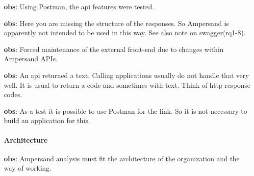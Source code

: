 \begin{obs}\label{obs:rq1-72:14-11}
    \textbf{obs}: Using Postman, the api features were tested.
\end{obs}
    
\begin{obs}\label{obs:rq1-73:14-11}
    \textbf{obs}: Here you are missing the structure of the responses.
    So Ampersand is apparently not intended to be used in this way.
    See also note on swagger(rq1-8).
\end{obs}
    
\begin{obs}\label{obs:rq1-74:16-11}
    \textbf{obs}: Forced maintenance of the external front-end due to changes within Ampersand APIs.
\end{obs}

\begin{obs}\label{obs:rq4-2}
    \textbf{obs}: An api returned a text.
    Calling applications usually do not handle that very well.
    It is usual to return a code and sometimes with text.
    Think of http response codes.
\end{obs}

\begin{obs}\label{obs:rq4-5}
    \textbf{obs}: As a test it is possible to use Postman for the link.
    So it is not necessary to build an application for this.
\end{obs}

\paragraph{Architecture}
\begin{obs}\label{obs:rq1-62:10-11}
    \textbf{obs}: Ampersand analysis must fit the architecture of the organization and the way of working.
\end{obs}

